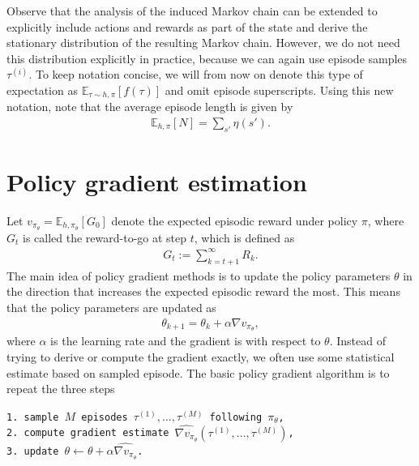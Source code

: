 \documentclass[a4paper]{report}
\theoremstyle{definition}
\theoremstyle{plain}
\begin{document}
Observe that the analysis of the induced Markov chain can be extended to
explicitly include actions and rewards as part of the state and derive the
stationary distribution of the resulting Markov chain. However, we do not need
this distribution explicitly in practice, because we can again use episode
samples $\tau^{(i)}$. To keep notation concise, we will from now on denote this
type of expectation as $\mathbb{E}_{\tau \sim h,\pi}[f(\tau)]$ and omit episode
superscripts.
%
Using this new notation, note that the average episode length is given by
\begin{align*}
  \mathbb{E}_{h, \pi} [ N ]= \sum_{s'} \eta(s') .
\end{align*}

\section{Policy gradient estimation}

Let $v_{\pi_{\theta}} = \mathbb{E}_{h,\pi_{\theta}}[G_{0}]$ denote the expected
episodic reward under policy $\pi$, where $G_{t}$ is called the reward-to-go at
step $t$, which is defined as
\begin{align*}
  G_{t} := \sum_{k=t+1}^{\infty} R_{k} .
\end{align*}
The main idea of policy gradient methods is to update the policy parameters
$\theta$ in the direction that increases the expected episodic reward the most. This
means that the policy parameters are updated as
\begin{align*}
  \theta_{k+1} = \theta_{k} + \alpha \nabla v_{\pi_{\theta}} ,
\end{align*}
where $\alpha$ is the learning rate and the gradient is with respect to
$\theta$. Instead of trying to derive or compute the gradient exactly, we often
use some statistical estimate based on sampled episode. The basic policy
gradient algorithm is to repeat the three steps

\vspace{1em}
\noindent
\hspace*{1em} \texttt{1. sample $M$ episodes $\tau^{(1)}, \dots, \tau^{(M)}$ following $\pi_{\theta}$,}\\
\hspace*{1em} \texttt{2. compute gradient estimate $\widehat{\nabla v_{\pi_{\theta}}}(\tau^{(1)}, \dots, \tau^{(M)})$,} \\
\hspace*{1em} \texttt{3. update $\theta \leftarrow \theta + \alpha \widehat{\nabla v_{\pi_{\theta}}}$.}
\end{document}

